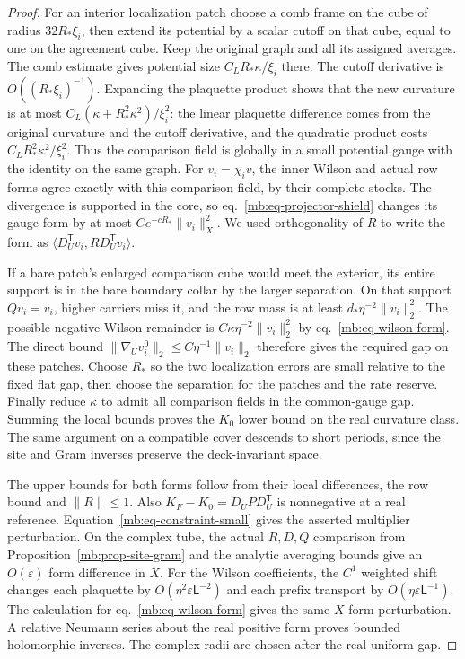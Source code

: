 \documentclass[11pt,letterpaper,reqno]{amsart}
\numberwithin{equation}{section}
\renewcommand{\eqref}[1]{\textup{eq.~\ref{#1}}}
\theoremstyle{definition}
\theoremstyle{remark}
\begin{document}
\begin{proof}
For an interior localization patch choose a comb frame
on the cube of radius \(32R_*\xi_i\), then extend its
potential by a scalar cutoff on that cube, equal to one
on the agreement cube. Keep the original graph and all
its assigned averages. The comb estimate gives potential
size \(C_LR_*\kappa/\xi_i\) there. The cutoff derivative
is \(O((R_*\xi_i)^{-1})\). Expanding the plaquette
product shows that the new curvature is at most
\(C_L(\kappa+R_*^2\kappa^2)/\xi_i^2\): the linear
plaquette difference comes from the original curvature
and the cutoff derivative, and the quadratic product
costs \(C_LR_*^2\kappa^2/\xi_i^2\).
Thus the comparison field is globally in a small
potential gauge with the identity on the same graph.
For \(v_i=\chi_i v\), the inner Wilson and actual row
forms agree exactly with this comparison field, by their
complete stocks. The divergence is supported in the core,
so \eqref{mb:eq-projector-shield} changes its gauge form
by at most \(Ce^{-cR_*}\|v_i\|_X^2\).
We used orthogonality of \(R\) to write the form as
\(\langle D_U^{\mathsf T}v_i,R D_U^{\mathsf T}v_i\rangle\).

If a bare patch's enlarged comparison cube would meet
the exterior, its entire support is in the bare
boundary collar by the larger separation. On that
support \(Qv_i=v_i\), higher carriers miss it, and the
row mass is at least \(d_*\eta^{-2}\|v_i\|_2^2\).
The possible negative Wilson remainder is
\(C\kappa\eta^{-2}\|v_i\|_2^2\) by
\eqref{mb:eq-wilson-form}. The direct bound
\(\|\nabla_U v_i^0\|_2\le C\eta^{-1}\|v_i\|_2\)
therefore gives the required gap on these patches.
Choose \(R_*\) so the two localization errors are
small relative to the fixed flat gap, then choose the
separation for the patches and the rate reserve.
Finally reduce \(\kappa\) to admit all comparison
fields in the common-gauge gap. Summing the local
bounds proves the \(K_0\) lower bound on the real
curvature class. The same argument on a compatible
cover descends to short periods, since the site
and Gram inverses preserve the deck-invariant space.

The upper bounds for both forms follow from their
local differences, the row bound and \(\|R\|\le1\).
Also \(K_F-K_0=D_UPD_U^{\mathsf T}\) is nonnegative
at a real reference. Equation~\ref{mb:eq-constraint-small}
gives the asserted multiplier perturbation. On the
complex tube, the actual \(R,D,Q\) comparison from
Proposition~\ref{mb:prop-site-gram} and the analytic
averaging bounds give an \(O(\varepsilon)\) form
difference in \(X\). For the Wilson coefficients, the
\(C^1\) weighted shift changes each plaquette by
\(O(\eta^2\varepsilon\mathsf L^{-2})\) and each prefix
transport by \(O(\eta\varepsilon\mathsf L^{-1})\).
The calculation for \eqref{mb:eq-wilson-form} gives
the same \(X\)-form perturbation. A relative Neumann
series about the real positive form proves bounded
holomorphic inverses. The complex radii are chosen
after the real uniform gap.
\end{proof}
\end{document}
